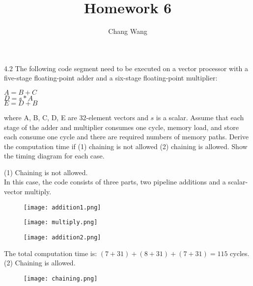 \documentclass[12pt]{report}
\title{Homework 6}
\author{Chang Wang}
\begin{document}
\maketitle

4.2 The following code segment need to be executed on a vector processor with a five-stage floating-point adder and a six-stage floating-point multiplier:
\begin{center}
$A = B + C$\\
$D = s * A$\\
$E = D + B$
\end{center}
where A, B, C, D, E are 32-element vectors and $s$ is a scalar. Assume that each stage of the adder and multiplier consumes one cycle, memory load, and store each consume one cycle and there are required numbers of memory paths. Derive the computation time if (1) chaining is not allowed (2) chaining is allowed. Show the timing diagram for each case.

(1) Chaining is not allowed. \\
In this case, the code consists of three parts, two pipeline additions and a scalar-vector multiply. \\

\begin{figure}[hb]
\begin{center}
\texttt{[image: addition1.png]}
\end{center}
\end{figure}

\begin{figure}[hb]
\begin{center}
\texttt{[image: multiply.png]}
\end{center}
\end{figure}

\begin{figure}[hb]
\begin{center}
\texttt{[image: addition2.png]}
\end{center}
\end{figure}

The total computation time is: $(7 + 31) + (8 + 31) + (7 + 31) = 115$ cycles. \\

(2) Chaining is allowed. \\

\begin{figure}[hb]
\begin{center}
\texttt{[image: chaining.png]}
\end{center}
\end{figure}
\end{document}
